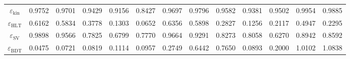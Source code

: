 \documentclass[10pt,a4paper]{article}
\begin{document}
\begin{landscape}
{\begin{tabular}{c|cccc|cccc|cccc}
\midrule
$\varepsilon_{\mathrm{kin}}$ & 0.9752 & 0.9701 & 0.9429 & 0.9156 & 0.8427 & 0.9697 & 0.9796 & 0.9582 & 0.9381 & 0.9502 & 0.9954 & 0.9885\\
$\varepsilon_{\mathrm{HLT}}$ & 0.6162 & 0.5834 & 0.3778 & 0.1303 & 0.0652 & 0.6356 & 0.5898 & 0.2827 & 0.1256 & 0.2117 & 0.4947 & 0.2295\\
$\varepsilon_{\mathrm{SV}}$ & 0.9898 & 0.9566 & 0.7825 & 0.6799 & 0.7770 & 0.9664 & 0.9291 & 0.8273 & 0.8058 & 0.6270 & 0.8942 & 0.8592\\
$\varepsilon_{\mathrm{BDT}}$ & 0.0475 & 0.0721 & 0.0819 & 0.1114 & 0.0957 & 0.2749 & 0.6442 & 0.7650 & 0.0893 & 0.2000 & 1.0102 & 1.0838\\
\bottomrule
\end{tabular}}

\end{landscape}
\clearpage
\end{document}
